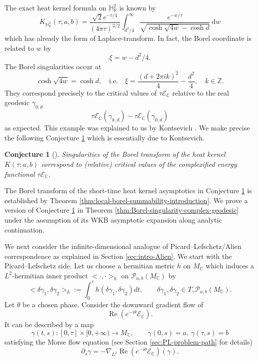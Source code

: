 \documentclass[11pt]{amsart}
\theoremstyle{plain}
\newtheorem{conj}[thm]{Conjecture}
\theoremstyle{definition}
\newcommand{\R}{\mathbb{R}}
\newcommand{\C}{\mathbb{C}}
\newcommand{\Z}{\mathbb Z}
\newcommand{\dd}{\mathrm d}
\newcommand{\HH}{\mathbb{H}}
\DeclareMathOperator{\re}{Re}
\begin{document}
The exact heat kernel formula on $\HH^2_{\R}$ is known by
\begin{equation*}
K_{\HH_{\R}^{2}}(\tau;a,b)
=
\frac{\sqrt{2}e^{-\tau/4}}{(4\pi \tau)^{3/2}}\int_{d^2/4}^{\infty}\frac{e^{-w/\tau}}{\sqrt{\cosh\sqrt{4w}-\cosh d}}~\dd w
\end{equation*}
which has already the form of Laplace-transform. In fact, the Borel coordinate is related to $w$ by 
$$
\xi=w-d^2/4. 
$$
The Borel singularities occur at
$$
{\cosh\sqrt{4w}}=\cosh d, \quad \text{i.e.}\quad \xi=\frac{(d+2\pi i k)^2}{4}-\frac{d^2}{4}, \quad k\in \Z.
$$
They correspond precisely to the critical values of $\tau\mathcal E_{\C}$ relative to the real geodesic $\gamma_{{0},d}$
$$
\tau\mathcal E_{\C}(\gamma_{{k},d})-\tau\mathcal E_{\C}(\gamma_{{0},d})
$$
as expected. This example was explained to us by Kontsevich \cite{Kont,Kont2020}. We make precise the following Conjecture \ref{conj:singularity} which is essentially due to Kontsevich. 

\begin{conj}[\cite{Kont, Kont2020}]\label{conj:singularity} Singularities of the Borel transform of the heat kernel $K(\tau;a,b)$ correspond to (relative) critical values of the complexified energy functional $\tau \mathcal E_{\C}$. 
\end{conj}

The Borel transform of the  short-time heat kernel asymptotics in Conjecture \ref{conj:singularity}  is established by Theorem \ref{thm:local-borel-summability-introduction}. We prove a version of Conjecture \ref{conj:singularity} in Theorem \ref{thm:Borel-singularity-complex-geodesic} 
under the assumption of its WKB asymptotic expansion along analytic continuation.

We next consider the infinite-dimensional analogue of Picard–Lefschetz/Alien correspondence as explained in Section \ref{sec:intro-Alien}. We start with the Picard–Lefschetz side. Let us choose a hermitian metric $h$ on $M_\C$ which induces a $L^2$-hermitian inner product $<\cdot,\cdot>_\hbar$ on $\mathcal P_{a,b}(M_{\C})$ by 
$$
<\delta \gamma_1, \delta \gamma_2>_h:=\int_0^\tau h(\delta \gamma_1, \delta \gamma_2) dt, \qquad \delta \gamma_1, \delta \gamma_2 \in T_\gamma \mathcal P_{a,b}(M_{\C}).
$$
Let $\theta$ be a chosen phase. Consider the downward gradient flow of 
$$
\re(e^{-i\theta}\mathcal E_\C). 
$$
It can be described by a map 
\[
\gamma(t, s): [0,\tau] \times [0,+\infty) \to M_{\C},\qquad \gamma(0,s)=a, \ \gamma(\tau,s)=b
\]
satisfying the Morse flow equation  (see Section \ref{sec:PL-problem-path} for details)
\begin{equation}\label{eqn:morse-flow}
\partial_s\gamma=-\nabla_{L^2}\re(e^{-i\theta}\mathcal E_\C)(\gamma) \tag{$\dagger$}.
\end{equation}
\end{document}
